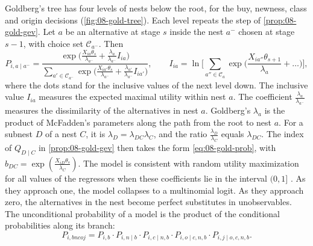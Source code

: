  Goldberg's tree has four levels of nests below the root, for the buy, newness, class
and origin decisions (\cref{fig:08-gold-tree}). Each level repeats the step of \cref{prop:08-gold-gev}. Let $a$ be
an alternative at stage $s$ inside the nest $a^-$ chosen at stage $s-1$, with choice set $\mathcal{C}_{a^-}$.
Then
\begin{equation}\label{eq:08-gold-prob}
P_{i, a \mid a^-} = \frac{\exp\big(\frac{X_{ia}\theta_s}{\lambda_{a^-}} + \frac{\lambda_a}{\lambda_{a^-}}
I_{ia}\big)}{\sum_{a' \in \mathcal{C}_{a^-}}\exp\big(\frac{X_{ia'}\theta_s}{\lambda_{a^-}} +
\frac{\lambda_{a'}}{\lambda_{a^-}} I_{ia'}\big)},
\qquad
I_{ia} = \ln\Big[\sum_{a'' \in \mathcal{C}_a}\exp\Big(\frac{X_{ia''}\theta_{s+1}}{\lambda_a} + \dots\Big)\Big],
\end{equation}
where the dots stand for the inclusive values of the next level down. The inclusive value $I_{ia}$
measures the expected maximal utility within nest $a$. The coefficient $\frac{\lambda_a}{\lambda_{a^-}}$
measures the dissimilarity of the alternatives in nest $a$. Goldberg's $\lambda_a$ is the product of McFadden's
parameters along the path from the root to nest $a$. For a subnest $D$ of a nest $C$, it is $\lambda_D =
\lambda_{DC}\lambda_C$, and the ratio $\frac{\lambda_D}{\lambda_C}$ equals $\lambda_{DC}$. The index of $Q_{D \mid C}$ in
\cref{prop:08-gold-gev} then takes the form \eqref{eq:08-gold-prob}, with $b_{DC} = \exp(\frac{X_{iD}\theta_s}
{\lambda_C})$. The model is consistent with random utility maximization for all values of the regressors when these
coefficients lie in the interval $(0, 1]$ \citep[pp.~1421, 1425]{McFadden1984}. As they approach one, the model
collapses to a multinomial logit. As they approach zero, the alternatives in the nest become perfect substitutes
in unobservables. The unconditional probability of a model is the product of the conditional probabilities
along its branch:
\begin{equation}\label{eq:08-gold-chain}
P_{i,bncoj} = P_{i,b}\cdot P_{i,n\mid b}\cdot P_{i,c\mid n,b}\cdot P_{i,o\mid c,n,b}\cdot P_{i,j\mid o,c,n,b}.
\end{equation}

